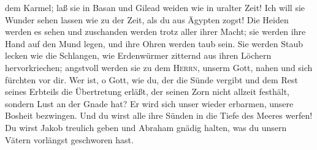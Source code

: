 dem Karmel; laß sie in Basan und Gilead weiden wie in uralter Zeit!
 Ich will sie Wunder sehen lassen wie zu der Zeit, als du
aus Ägypten zogst!  Die Heiden werden es sehen und
zuschanden werden trotz aller ihrer Macht; sie werden ihre Hand auf den
Mund legen, und ihre Ohren werden taub sein.  Sie werden
Staub lecken wie die Schlangen, wie Erdenwürmer zitternd aus ihren
Löchern hervorkriechen; angstvoll werden sie zu dem \textsc{Herrn},
unserm Gott, nahen und sich fürchten vor dir.  Wer ist, o
Gott, wie du, der die Sünde vergibt und dem Rest seines Erbteils die
Übertretung erläßt, der seinen Zorn nicht allzeit festhält, sondern Lust
an der Gnade hat?  Er wird sich unser wieder erbarmen,
unsere Bosheit bezwingen. Und du wirst alle ihre Sünden in die Tiefe des
Meeres werfen!  Du wirst Jakob treulich geben und Abraham
gnädig halten, was du unsern Vätern vorlängst geschworen hast.
